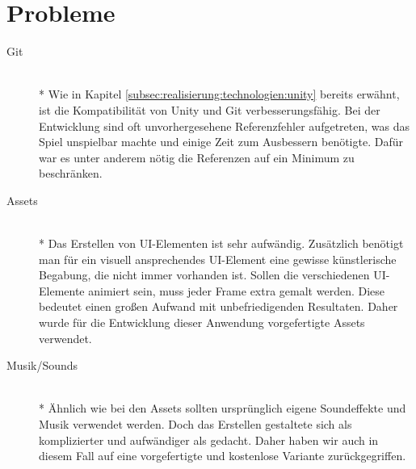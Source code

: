 \section{Probleme}
\label{sec:implementierung:probleme}
\begin{description}
    \item[Git] \hfill \\* Wie in Kapitel \ref{subsec:realisierung:technologien:unity} bereits erwähnt, ist die Kompatibilität von Unity und Git verbesserungsfähig. Bei der Entwicklung sind oft unvorhergesehene Referenzfehler aufgetreten, was das Spiel unspielbar machte und einige Zeit zum Ausbessern benötigte. Dafür war es unter anderem nötig die Referenzen auf ein Minimum zu beschränken.
    \item[Assets] \hfill \\* Das Erstellen von UI-Elementen ist sehr aufwändig. Zusätzlich benötigt man für ein visuell ansprechendes UI-Element eine gewisse künstlerische Begabung, die nicht immer vorhanden ist. Sollen die verschiedenen UI-Elemente animiert sein, muss jeder Frame extra gemalt werden. Diese bedeutet einen großen Aufwand mit unbefriedigenden Resultaten. Daher wurde für die Entwicklung dieser Anwendung vorgefertigte Assets verwendet.
    \item[Musik/Sounds] \hfill \\* Ähnlich wie bei den Assets sollten ursprünglich eigene Soundeffekte und Musik verwendet werden. Doch das Erstellen gestaltete sich als komplizierter und aufwändiger als gedacht. Daher haben wir auch in diesem Fall auf eine vorgefertigte und kostenlose Variante zurückgegriffen.
\end{description}





























